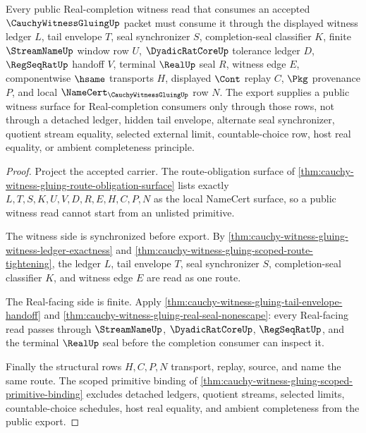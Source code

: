 \begin{theorem}
\label{thm:cauchy-witness-gluing-public-witness-export}
Every public Real-completion witness read that consumes an accepted $\CauchyWitnessGluingUp$ packet must consume it through the displayed witness ledger $L$, tail envelope $T$, seal synchronizer $S$, completion-seal classifier $K$, finite $\StreamNameUp$ window row $U$, $\DyadicRatCoreUp$ tolerance ledger $D$, $\RegSeqRatUp$ handoff $V$, terminal $\RealUp$ seal $R$, witness edge $E$, componentwise $\hsame$ transports $H$, displayed $\Cont$ replay $C$, $\Pkg$ provenance $P$, and local $\NameCert_{\CauchyWitnessGluingUp}$ row $N$. The export supplies a public witness surface for Real-completion consumers only through those rows, not through a detached ledger, hidden tail envelope, alternate seal synchronizer, quotient stream equality, selected external limit, countable-choice row, host real equality, or ambient completeness principle.
\end{theorem}
\begin{proof}
Project the accepted carrier. The route-obligation surface of \autoref{thm:cauchy-witness-gluing-route-obligation-surface} lists exactly $L,T,S,K,U,V,D,R,E,H,C,P,N$ as the local NameCert surface, so a public witness read cannot start from an unlisted primitive.

The witness side is synchronized before export. By \autoref{thm:cauchy-witness-gluing-witness-ledger-exactness} and \autoref{thm:cauchy-witness-gluing-scoped-route-tightening}, the ledger $L$, tail envelope $T$, seal synchronizer $S$, completion-seal classifier $K$, and witness edge $E$ are read as one route.

The Real-facing side is finite. Apply \autoref{thm:cauchy-witness-gluing-tail-envelope-handoff} and \autoref{thm:cauchy-witness-gluing-real-seal-nonescape}: every Real-facing read passes through $\StreamNameUp$, $\DyadicRatCoreUp$, $\RegSeqRatUp$, and the terminal $\RealUp$ seal before the completion consumer can inspect it.

Finally the structural rows $H,C,P,N$ transport, replay, source, and name the same route. The scoped primitive binding of \autoref{thm:cauchy-witness-gluing-scoped-primitive-binding} excludes detached ledgers, quotient streams, selected limits, countable-choice schedules, host real equality, and ambient completeness from the public export.
\end{proof}


